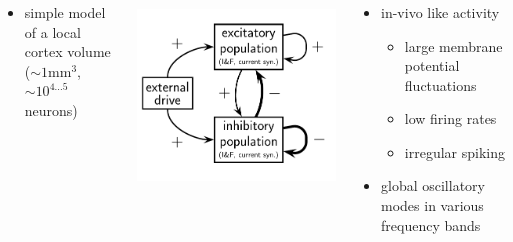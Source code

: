\documentclass[8pt,t,usepdftitle=false]{beamer}
\begin{document}
\begin{frame}[t,plain]
  \frametitle{\ttl}
  \begin{columns}
    \centering
    \parbox{\linewidth}{\footnotesize
      \begin{itemize}
      \item[] simple model of a local cortex volume {\tiny\parencite{Brunel00_183}}\\        
      ($\sim{}1\text{mm}^3$, $\sim{}10^{4\ldots{}5}$ neurons)
      \end{itemize}
    }\\
    \includegraphics[width=0.8\linewidth]{figures/brunel}\\[-2ex]
    \begin{itemize}
    \item<1-> in-vivo like activity
      \begin{itemize}\normalsize
      \item large membrane potential fluctuations
      \item low firing rates
      \item irregular spiking
      \end{itemize}
    \item<1-> global oscillatory modes in various frequency
      bands
    \end{itemize}
    \footnotesize
    \centering
\end{columns}
\end{frame}
\end{document}
